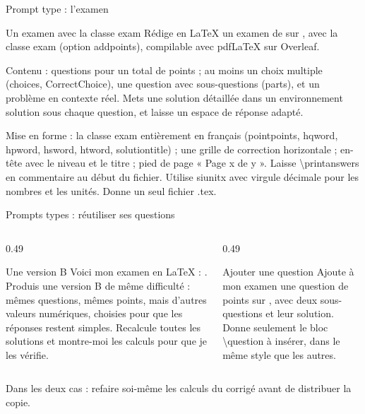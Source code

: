 \begin{frame}{Prompt type : l'examen}
  \begin{Prompt}{Un examen avec la classe exam}
    \footnotesize Rédige en LaTeX un examen de  sur , avec la classe exam
    (option addpoints), compilable avec pdfLaTeX sur Overleaf.

    Contenu :  questions pour un total de  points ;
    au moins un choix multiple (choices, CorrectChoice), une question avec
    sous-questions (parts), et un problème en contexte réel. Mets une
    solution détaillée dans un environnement solution sous chaque question,
    et laisse un espace de réponse adapté.

    Mise en forme : la classe exam entièrement en français (pointpoints,
    hqword, hpword, hsword, htword, solutiontitle) ; une grille de
    correction horizontale ; en-tête avec le niveau et le titre ; pied de
    page « Page x de y ». Laisse \textbackslash printanswers en
    commentaire au début du fichier. Utilise siunitx avec virgule décimale
    pour les nombres et les unités. Donne un seul fichier .tex.
  \end{Prompt}
\end{frame}

\begin{frame}{Prompts types : réutiliser ses questions}
  \begin{columns}[T]
    \begin{column}{0.49\textwidth}
      \begin{Prompt}{Une version B}
        \scriptsize Voici mon examen en LaTeX : . Produis
        une version B de même difficulté : mêmes questions, mêmes points,
        mais d'autres valeurs numériques, choisies pour que les réponses
        restent simples. Recalcule toutes les solutions et montre-moi les
        calculs pour que je les vérifie.
      \end{Prompt}
    \end{column}
    \begin{column}{0.49\textwidth}
      \begin{Prompt}{Ajouter une question}
        \scriptsize Ajoute à mon examen une question de  points
        sur , avec deux
        sous-questions et leur solution. Donne seulement le bloc
        \textbackslash question à insérer, dans le même style que les
        autres.
      \end{Prompt}
    \end{column}
  \end{columns}
  \vspace{6pt}
  \small Dans les deux cas : refaire soi-même les calculs du corrigé avant
  de distribuer la copie.
\end{frame}
